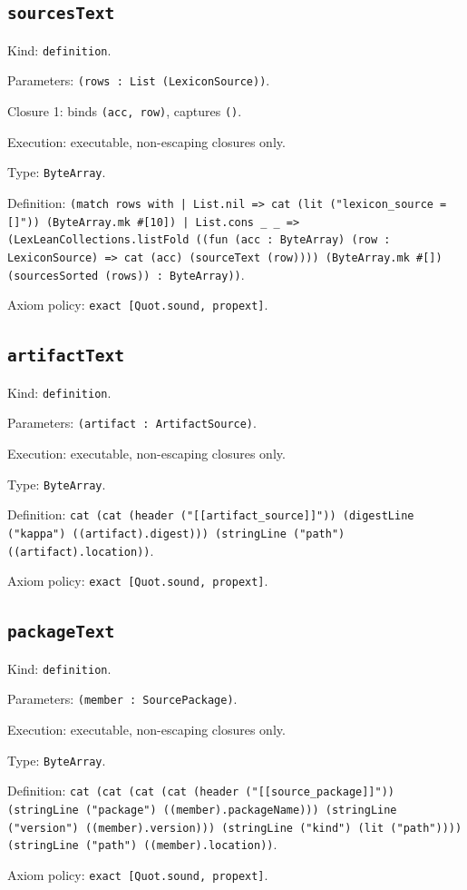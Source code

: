 \documentclass[11pt]{article}
\begin{document}
\subsection*{\texttt{sourcesText}}
\noindent Kind: \texttt{definition}.\par
\noindent Parameters: \texttt{(rows : List (LexiconSource))}.\par
\noindent Closure 1: binds \texttt{(acc, row)}, captures \texttt{()}.\par
\noindent Execution: executable, non-escaping closures only.\par
\noindent Type: \texttt{ByteArray}.\par
\noindent Definition: \texttt{(match rows with | List.nil => cat (lit ("lexicon\_source = []")) (ByteArray.mk \#[10]) | List.cons \_ \_ => (LexLeanCollections.listFold ((fun (acc : ByteArray) (row : LexiconSource) => cat (acc) (sourceText (row)))) (ByteArray.mk \#[]) (sourcesSorted (rows)) : ByteArray))}.\par
\noindent Axiom policy: \texttt{exact [Quot.sound, propext]}.\par
\subsection*{\texttt{artifactText}}
\noindent Kind: \texttt{definition}.\par
\noindent Parameters: \texttt{(artifact : ArtifactSource)}.\par
\noindent Execution: executable, non-escaping closures only.\par
\noindent Type: \texttt{ByteArray}.\par
\noindent Definition: \texttt{cat (cat (header ("[[artifact\_source]]")) (digestLine ("kappa") ((artifact).digest))) (stringLine ("path") ((artifact).location))}.\par
\noindent Axiom policy: \texttt{exact [Quot.sound, propext]}.\par
\subsection*{\texttt{packageText}}
\noindent Kind: \texttt{definition}.\par
\noindent Parameters: \texttt{(member : SourcePackage)}.\par
\noindent Execution: executable, non-escaping closures only.\par
\noindent Type: \texttt{ByteArray}.\par
\noindent Definition: \texttt{cat (cat (cat (cat (header ("[[source\_package]]")) (stringLine ("package") ((member).packageName))) (stringLine ("version") ((member).version))) (stringLine ("kind") (lit ("path")))) (stringLine ("path") ((member).location))}.\par
\noindent Axiom policy: \texttt{exact [Quot.sound, propext]}.\par
\end{document}
